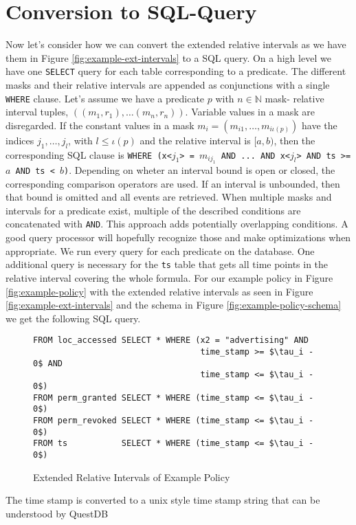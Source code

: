 \section{Conversion to SQL-Query}
Now let's consider how we can convert the extended relative intervals as we have them in Figure \ref{fig:example-ext-intervals} to a SQL query.
On a high level we have one \texttt{SELECT} query for each table corresponding to a predicate. The different masks and their relative intervals are appended as conjunctions with a single \texttt{WHERE} clause.
Let's assume we have a predicate $p$ with $n \in \mathbb{N}$ mask- relative interval tuples, $((m_1, r_1), \dots (m_n,r_n))$.
Variable values in a mask are disregarded.
If the constant values in a mask $m_i = (m_{i1}, \dots, m_{i{\iota(p)}})$ 
have the indices $j_1, \dots, j_l$, with 
$l \leq \iota(p)$
and the relative interval is $[a,b)$, then the corresponding SQL clause is \texttt{WHERE (x<$j_1$> = $m_{ij_1}$ AND ... AND x<$j_l$> AND ts >= $a$ AND ts < $b$)}.
Depending on wheter an interval bound is open or closed, the corresponding comparison operators are used.
If an interval is unbounded, then that bound is omitted and all events are retrieved.
When multiple masks and intervals for a predicate exist, multiple of the described conditions are concatenated with \texttt{AND}.
This approach adds potentially overlapping conditions.
A good query processor will hopefully recognize those and make optimizations when appropriate.
We run every query for each predicate on the database.
One additional query is necessary for the \texttt{ts} table that gets all time points in the relative interval covering the whole formula.
For our example policy in Figure \ref{fig:example-policy} with the extended relative intervals as seen in Figure \ref{fig:example-ext-intervals} and the schema in Figure \ref{fig:example-policy-schema} we get the following SQL query.

\begin{figure}[H]
    \label{fig:ext-sql-query}
\begin{lstlisting}
FROM loc_accessed SELECT * WHERE (x2 = "advertising" AND
                                  time_stamp >= $\tau_i - 0$ AND
                                  time_stamp <= $\tau_i - 0$)
FROM perm_granted SELECT * WHERE (time_stamp <= $\tau_i - 0$)
FROM perm_revoked SELECT * WHERE (time_stamp <= $\tau_i - 0$)
FROM ts           SELECT * WHERE (time_stamp <= $\tau_i - 0$)
\end{lstlisting}
    \caption{Extended Relative Intervals of Example Policy}
\end{figure}

The time stamp is converted to a unix style time stamp string that can be understood by QuestDB \cite{questdb-time-stamps}



